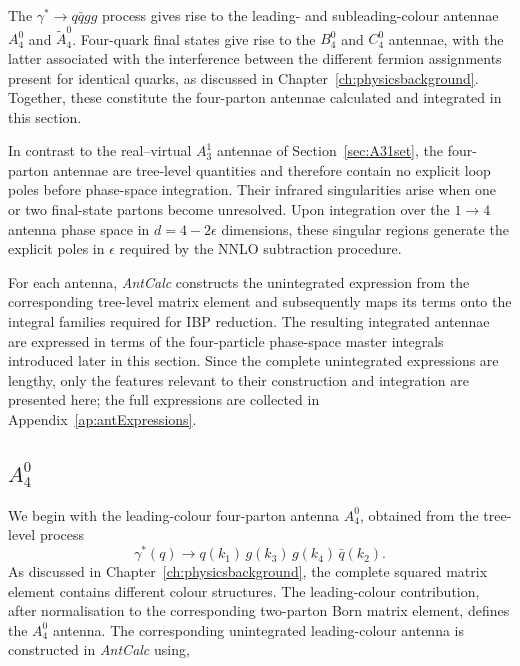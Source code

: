 The $\gamma^*\rightarrow q\bar qgg$ process gives rise to the leading- and
subleading-colour antennae $A_4^0$ and $\widetilde A_4^0$. Four-quark final states
give rise to the $B_4^0$ and $C_4^0$ antennae, with the latter associated with the
interference between the different fermion assignments present for identical quarks,
as discussed in Chapter~\ref{ch:physicsbackground}. Together, these constitute the
four-parton antennae calculated and integrated in this section.

In contrast to the real--virtual $A_3^1$ antennae of Section~\ref{sec:A31set}, the
four-parton antennae are tree-level quantities and therefore contain no explicit loop
poles before phase-space integration. Their infrared singularities arise when one or
two final-state partons become unresolved. Upon integration over the $1\to4$ antenna
phase space in $d=4-2\epsilon$ dimensions, these singular regions generate the
explicit poles in $\epsilon$ required by the NNLO subtraction procedure.

For each antenna, \textit{AntCalc} constructs the unintegrated expression from the
corresponding tree-level matrix element and subsequently maps its terms onto the
integral families required for IBP reduction. The resulting integrated antennae are
expressed in terms of the four-particle phase-space master integrals introduced later
in this section. Since the complete unintegrated expressions are lengthy, only the
features relevant to their construction and integration are presented here; the full
expressions are collected in Appendix~\ref{ap:antExpressions}.

\subsection{$A_4^0$}\label{subsec:A40}

We begin with the leading-colour four-parton antenna $A_4^0$, obtained from the tree-level
process
\begin{equation*}
    \gamma^*(q)\rightarrow q(k_1)\,g(k_3)\,g(k_4)\,\bar q(k_2).
\end{equation*}
As discussed in Chapter~\ref{ch:physicsbackground}, the complete squared matrix element
contains different colour structures. The leading-colour contribution, after normalisation to
the corresponding two-parton Born matrix element, defines the $A_4^0$ antenna. The
corresponding unintegrated leading-colour antenna is constructed in \textit{AntCalc} using,

